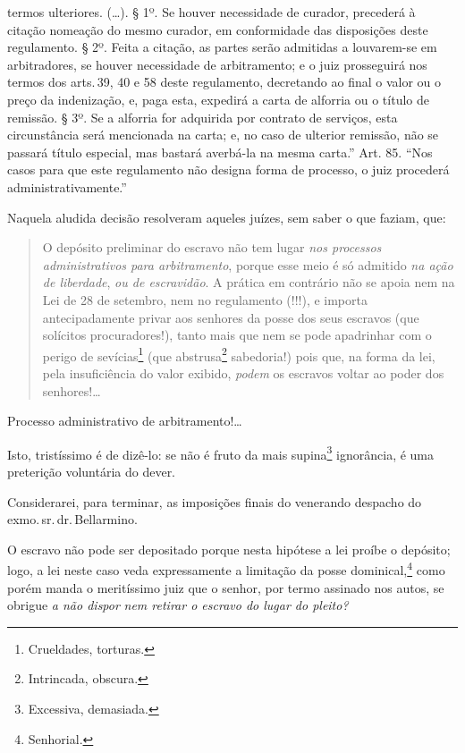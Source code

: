 {  termos ulteriores. (\ldots{}). § 1º. Se houver necessidade de curador,
  precederá à citação nomeação do mesmo curador, em conformidade das
  disposições deste regulamento. § 2º. Feita a citação, as partes serão
  admitidas a louvarem-se em arbitradores, se houver necessidade de
  arbitramento; e o juiz prosseguirá nos termos dos arts.\,39, 40 e 58
  deste regulamento, decretando ao final o valor ou o preço da
  indenização, e, paga esta, expedirá a carta de alforria ou o título de
  remissão. § 3º. Se a alforria for adquirida por contrato de serviços,
  esta circunstância será mencionada na carta; e, no caso de ulterior
  remissão, não se passará título especial, mas bastará averbá-la na
  mesma carta.'' Art. 85. ``Nos casos para que este regulamento não designa
  forma de processo, o juiz procederá administrativamente.''}

Naquela aludida decisão resolveram aqueles juízes, sem saber o que
faziam, que:

\begin{quote}
O depósito preliminar do escravo não tem lugar \emph{nos processos
administrativos para arbitramento}, porque esse meio é só admitido
\emph{na ação de liberdade}, \emph{ou de escravidão}. A prática em
contrário não se apoia nem na Lei de 28 de setembro, nem no regulamento
(!!!), e importa antecipadamente privar aos senhores da posse dos seus
escravos (que solícitos procuradores!), tanto mais que nem se pode
apadrinhar com o perigo de sevícias\footnote{Crueldades, torturas.}
(que abstrusa\footnote{Intrincada, obscura.} sabedoria!) pois que, na
forma da lei, pela insuficiência do valor exibido, \emph{podem} os
escravos voltar ao poder dos senhores!\ldots{}
\end{quote}

Processo administrativo de arbitramento!\ldots{}

Isto, tristíssimo é de dizê-lo: se não é fruto da mais supina\footnote{
  Excessiva, demasiada.} ignorância, é uma preterição voluntária do
dever.

Considerarei, para terminar, as imposições finais do venerando despacho
do exmo.\,sr.\,dr.\,Bellarmino.

O escravo não pode ser depositado porque nesta hipótese a lei proíbe o
depósito; logo, a lei neste caso veda expressamente a limitação da posse
dominical,\footnote{Senhorial.} como porém manda o meritíssimo juiz
que o senhor, por termo assinado nos autos, se obrigue \emph{a não
dispor} \emph{nem retirar o escravo do lugar do pleito? }

